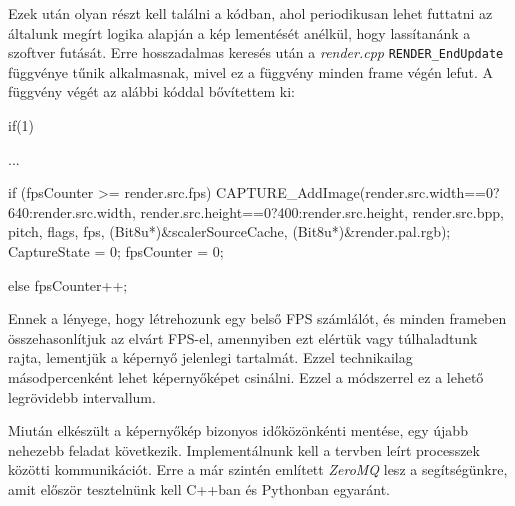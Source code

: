 Ezek után olyan részt kell találni a kódban, ahol periodikusan lehet futtatni az általunk megírt logika alapján a kép lementését anélkül, hogy lassítanánk a szoftver futását. Erre hosszadalmas keresés után a \textit{render.cpp} \verb|RENDER_EndUpdate| függvénye tűnik alkalmasnak, mivel ez a függvény minden frame végén lefut. 
A függvény végét az alábbi kóddal bővítettem ki:
\begin{cpp}
    if(1)
    {
        ...

        if (fpsCounter >= render.src.fps)
        {
            CAPTURE_AddImage(render.src.width==0?640:render.src.width, 
                             render.src.height==0?400:render.src.height, 
                             render.src.bpp, pitch,
                             flags, fps, (Bit8u*)&scalerSourceCache, 
                             (Bit8u*)&render.pal.rgb);
            CaptureState = 0;
            fpsCounter = 0;
        }
    
        else
        {
            fpsCounter++;
        } 
    }
\end{cpp}
Ennek a lényege, hogy létrehozunk egy belső FPS számlálót, és minden frameben összehasonlítjuk az elvárt FPS-el, amennyiben ezt elértük vagy túlhaladtunk rajta, lementjük a képernyő jelenlegi tartalmát.
Ezzel technikailag másodpercenként lehet képernyőképet csinálni. Ezzel a módszerrel ez a lehető legrövidebb intervallum.


Miután elkészült a képernyőkép bizonyos időközönkénti mentése, egy újabb nehezebb feladat következik. Implementálnunk kell a tervben leírt processzek közötti kommunikációt. 
Erre a már szintén említett \textit{ZeroMQ} lesz a segítségünkre, amit először tesztelnünk kell C++ban és Pythonban egyaránt.

